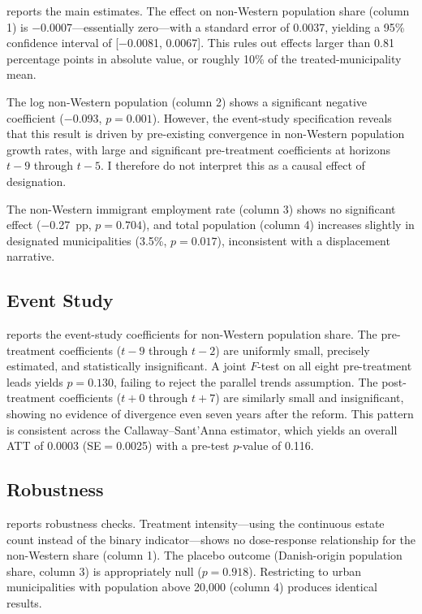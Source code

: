 \documentclass[12pt]{article}
\begin{document}


 reports the main estimates. The effect on non-Western population share (column 1) is $-$0.0007---essentially zero---with a standard error of 0.0037, yielding a 95\% confidence interval of [$-$0.0081, 0.0067]. This rules out effects larger than 0.81 percentage points in absolute value, or roughly 10\% of the treated-municipality mean.

The log non-Western population (column 2) shows a significant negative coefficient ($-$0.093, $p=0.001$). However, the event-study specification reveals that this result is driven by pre-existing convergence in non-Western population growth rates, with large and significant pre-treatment coefficients at horizons $t-9$ through $t-5$. I therefore do not interpret this as a causal effect of designation.

The non-Western immigrant employment rate (column 3) shows no significant effect ($-$0.27~pp, $p=0.704$), and total population (column 4) increases slightly in designated municipalities (3.5\%, $p=0.017$), inconsistent with a displacement narrative.

\subsection{Event Study}



 reports the event-study coefficients for non-Western population share. The pre-treatment coefficients ($t-9$ through $t-2$) are uniformly small, precisely estimated, and statistically insignificant. A joint $F$-test on all eight pre-treatment leads yields $p=0.130$, failing to reject the parallel trends assumption. The post-treatment coefficients ($t+0$ through $t+7$) are similarly small and insignificant, showing no evidence of divergence even seven years after the reform. This pattern is consistent across the Callaway--Sant'Anna estimator, which yields an overall ATT of 0.0003 (SE$=$0.0025) with a pre-test $p$-value of 0.116.

\subsection{Robustness}



 reports robustness checks. Treatment intensity---using the continuous estate count instead of the binary indicator---shows no dose-response relationship for the non-Western share (column 1). The placebo outcome (Danish-origin population share, column 3) is appropriately null ($p=0.918$). Restricting to urban municipalities with population above 20,000 (column 4) produces identical results.
\end{document}
